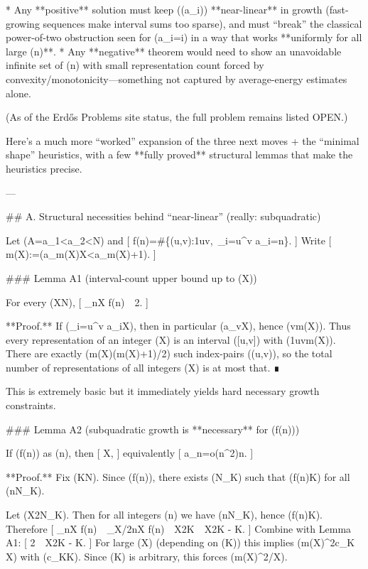 * Any **positive** solution must keep ((a_i)) **near-linear** in growth (fast-growing sequences make interval sums too sparse), and must “break” the classical power-of-two obstruction seen for (a_i=i) in a way that works **uniformly for all large (n)**.
* Any **negative** theorem would need to show an unavoidable infinite set of (n) with small representation count forced by convexity/monotonicity—something not captured by average-energy estimates alone.

(As of the Erdős Problems site status, the full problem remains listed OPEN.)

Here’s a much more “worked” expansion of the three next moves + the “minimal shape” heuristics, with a few **fully proved** structural lemmas that make the heuristics precise.

---

## A. Structural necessities behind “near‑linear” (really: subquadratic)

Let (A={a_1<a_2<\cdots}\subset\mathbb N) and
[
f(n)=\#\{(u,v):1\le u\le v,\ \sum_{i=u}^v a_i=n\}.
]
Write
[
m(X):=\quad(a_{m(X)}\le X<a_{m(X)+1}).
]

### Lemma A1 (interval-count upper bound up to (X))

For every (X\in\mathbb N),
[
\sum_{n\le X} f(n)\ \le\ 2.
]

**Proof.** If (\sum_{i=u}^v a_i\le X), then in particular (a_v\le X), hence (v\le m(X)). Thus every representation of an integer (\le X) is an interval ([u,v]) with (1\le u\le v\le m(X)). There are exactly (m(X)(m(X)+1)/2) such index-pairs ((u,v)), so the total number of representations of all integers (\le X) is at most that. ∎

This is extremely basic but it immediately yields hard necessary growth constraints.

### Lemma A2 (subquadratic growth is **necessary** for (f(n)\to\infty))

If (f(n)\to\infty) as (n\to\infty), then
[
\to\infty\quad{}X\to\infty,
]
equivalently
[
a_n=o(n^2)\quad{}n\to\infty.
]

**Proof.** Fix (K\in\mathbb N). Since (f(n)\to\infty), there exists (N_K) such that (f(n)\ge K) for all (n\ge N_K).

Let (X\ge 2N_K). Then for all integers (n\in [X/2,X]) we have (n\ge N_K), hence (f(n)\ge K). Therefore
[
\sum_{n\le X} f(n)\ \ge\ \sum_{X/2\le n\le X} f(n)\ \ge\ \left\lfloor\frac X2\right\rfloor \cdot K\ \ge\ \frac X2\cdot K - K.
]
Combine with Lemma A1:
[
2\ \ge\ \frac X2\cdot K - K.
]
For large (X) (depending on (K)) this implies (m(X)^2\ge c_K X) with (c_K\asymp K). Since (K) is arbitrary, this forces (m(X)^2/X\to\infty).

